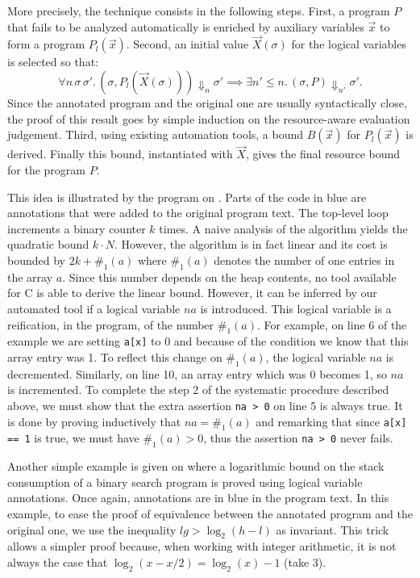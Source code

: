 \documentclass[nocopyrightspace,preprint,pldi]{sigplanconf-pldi15}
\newcommand{\pref}[1]{\prettyref{#1}}
\begin{document}
More precisely, the technique consists in the following steps. First,
a program $P$ that fails to be analyzed automatically is enriched by
auxiliary variables $\vec x$ to form a program
$P_l(\vec x)$.  Second, an initial value $\vec X(\sigma)$ for the
logical variables is selected so that:
$$
\forall n\, \sigma\, \sigma'.\,
  (\sigma, P_l(\vec X(\sigma))) \Downarrow_n \sigma'
    {\implies}
  \exists n' {\le} n.\,
    (\sigma, P) \Downarrow_{n'} \sigma'.
$$
Since the annotated program and the original one are usually
syntactically close, the proof of this result goes
by simple induction on the resource-aware evaluation judgement.
Third, using existing automation tools, a bound $B(\vec x)$ for
$P_l(\vec x)$ is derived.  Finally this bound, instantiated with
$\vec X$, gives the final resource bound for the program $P$.

This idea is illustrated by the program on \pref{fig:xmplincaux}.
Parts of the code in blue are annotations that were added
to the original program text.  The top-level loop increments
a binary counter $k$ times.  A naive analysis of
the algorithm yields the quadratic bound $k \cdot N$.
However, the algorithm is in fact linear and its cost is bounded
by $2k + \#_1(a)$ where $\#_1(a)$ denotes
the number of one entries in the array $a$.  Since this
number depends on the heap contents, no tool available
for C is able to derive the linear bound.  However, it can be inferred
by our automated tool if a logical variable $na$ is introduced.
This logical variable is a reification, in the program, of the
number $\#_1(a)$.  For example, on line 6 of the example
we are setting \lstinline{a[x]} to 0 and because of the condition we
know that this array entry was 1.  To reflect this change on
$\#_1(a)$, the logical variable $na$ is decremented.
Similarly, on line 10, an array entry which was 0 becomes 1, so
$na$ is incremented.  To complete the step 2 of the systematic
procedure described above, we must show that the extra assertion
\lstinline{na > 0} on line 5 is always true.  It
is done by proving inductively that $na = \#_1(a)$
and remarking that since \lstinline{a[x] == 1} is true, we must have
$\#_1(a) > 0$, thus the assertion \lstinline{na > 0} never fails. %

Another simple example is given on \pref{fig:xmplbsaux} where
a logarithmic bound on the stack consumption of a binary search
program is proved using logical variable annotations.  Once again,
annotations are in blue in the program text.  In this example,
to ease the proof of equivalence between the annotated program
and the original one, we use the inequality $lg >
\log_2(h-l)$ as invariant.  This trick allows a simpler
proof because, when working with integer arithmetic, it is not always
the case that $\log_2(x-x/2) = \log_2(x)-1$ (take 3).
\end{document}
